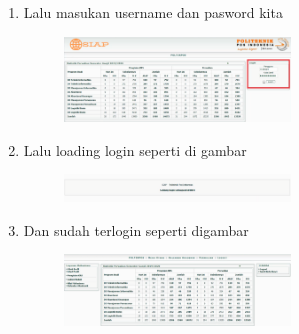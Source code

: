 \begin{enumerate}
	\item Lalu masukan username dan pasword kita
	\begin{figure} [h]
	\includegraphics[width=6cm]{login/5.png}
	\centering
	\end{figure}
	
	\item Lalu loading login seperti di gambar 
	\begin{figure} [h]
	\includegraphics[width=6cm]{login/6.png}
	\centering
	\end{figure}
	
	\item Dan sudah terlogin seperti digambar 
	\begin{figure} [h]
	\includegraphics[width=6cm]{login/7.png}
	\centering
	\end{figure}
	

\end{enumerate}
